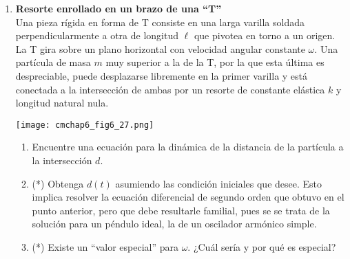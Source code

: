 \documentclass[11pt, a4paper, twoside]{article}
\begin{document}
\begin{enumerate}
\item
	\begin{minipage}[t][3.9cm]{0.7\textwidth}
		\textbf{Resorte enrollado en un brazo de una ``T''}\\
		Una pieza rígida en forma de T consiste en una larga varilla soldada perpendicularmente a otra de longitud \(\ell\) que pivotea en torno a un origen.
		La T gira sobre un plano horizontal con velocidad angular constante \(\omega\).
		Una partícula de masa \(m\) muy superior a la de la T, por la que esta última es despreciable, puede desplazarse libremente en la primer varilla y está conectada a la intersección de ambas por un resorte de constante elástica \(k\) y longitud natural nula.
	\end{minipage}
	\begin{minipage}[c][1cm][t]{0.3\textwidth}
		\texttt{[image: cmchap6\_fig6\_27.png]}
	\end{minipage}
	\begin{enumerate}
		\item  Encuentre una ecuación para la dinámica de la distancia de la partícula a la intersección \(d\).
		\item (*) Obtenga \(d(t)\) asumiendo las condición iniciales que desee. Esto implica resolver la ecuación diferencial de segundo orden que obtuvo en el punto anterior, pero que debe resultarle familial, pues se se trata de la solución para un péndulo ideal, la de un oscilador armónico simple.  
		\item (*) Existe un ``valor especial'' para \(\omega\). ¿Cuál sería y por qué es especial?
	\end{enumerate}


\end{enumerate}
\end{document}
